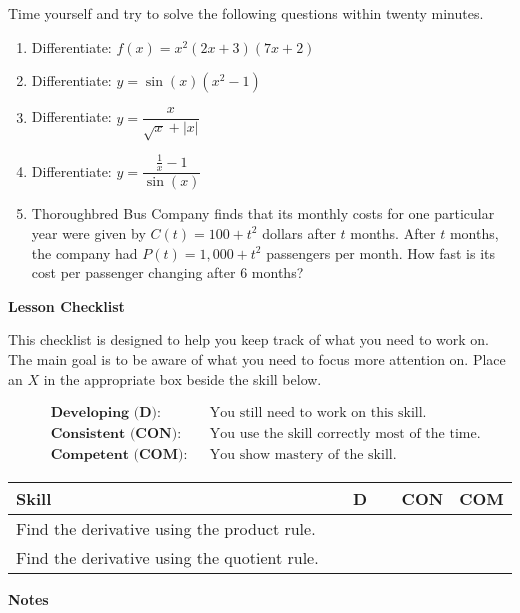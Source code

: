 \documentclass[10pt]{book}
\theoremstyle{definition}
\theoremstyle{remark}
\begin{document}
\begin{large}
\noindent
Time yourself and try to solve the following questions within twenty minutes. 
\begin{enumerate}
\item Differentiate: $f\left(x\right) = x^2\left(2x + 3\right)\left(7x + 2\right)$\vfil
\item Differentiate: $y =\sin(x)\left(x^2 - 1\right)$\vfil
\item Differentiate: $y =\dfrac{x}{\sqrt{x} + |x|}$\vfil
\item Differentiate: $y =\dfrac{\frac{1}{x}-1}{\sin(x)}$\vfil
\item Thoroughbred Bus Company finds that its monthly costs for one particular year were given by $C(t) = 100 + t^2$ dollars after $t$ months. After $ t$ months, the company had $P(t) = 1,000 + t^2$ passengers per month. How fast is its cost per passenger changing after 6 months? \vfil
\end{enumerate}

\noindent
\textbf{Lesson Checklist}
\bigskip

\noindent
This checklist is designed to help you keep track of what you need to work on. The main goal is to be aware of what you need to focus more attention on. Place an $X$ in the appropriate box beside the skill below. 
\bigskip

\noindent
\begin{align*}
&\textbf{Developing (D):} &&\textrm{You still need to work on this skill.}\\
&\textbf{Consistent (CON):} &&\textrm{You use the skill correctly most of the time.}\\
&\textbf{Competent (COM):} &&\textrm{You show mastery of the skill.} 
\end{align*}
\vfil

\begin{center}
\begin{tabular}{|l|l|l|l|}
\hline
\textbf{Skill} & \textbf{~~D~~} & \textbf{CON} & \textbf{COM} \\
\hline
Find the derivative using the product rule.&&&\\
\hline
Find the derivative using the quotient rule.&&&\\
\hline
\end{tabular}
\end{center}
 \vfil

\noindent
\textbf{Notes}
\end{large} \vfil
\newpage
\end{document}
